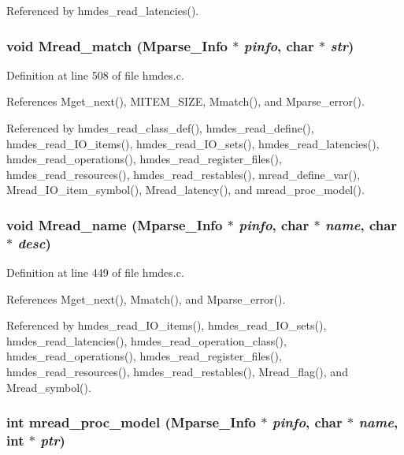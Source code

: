 Referenced by hmdes\_\-read\_\-latencies().
\subsubsection{\setlength{\rightskip}{0pt plus 5cm}void Mread\_\-match (\bf{Mparse\_\-Info} $\ast$ {\em pinfo}, char $\ast$ {\em str})}\label{hmdes_8c_6596ec52b951f99374fa8896ea78aa96}




Definition at line 508 of file hmdes.c.

References Mget\_\-next(), MITEM\_\-SIZE, Mmatch(), and Mparse\_\-error().

Referenced by hmdes\_\-read\_\-class\_\-def(), hmdes\_\-read\_\-define(), hmdes\_\-read\_\-IO\_\-items(), hmdes\_\-read\_\-IO\_\-sets(), hmdes\_\-read\_\-latencies(), hmdes\_\-read\_\-operations(), hmdes\_\-read\_\-register\_\-files(), hmdes\_\-read\_\-resources(), hmdes\_\-read\_\-restables(), mread\_\-define\_\-var(), Mread\_\-IO\_\-item\_\-symbol(), Mread\_\-latency(), and mread\_\-proc\_\-model().
\subsubsection{\setlength{\rightskip}{0pt plus 5cm}void Mread\_\-name (\bf{Mparse\_\-Info} $\ast$ {\em pinfo}, char $\ast$ {\em name}, char $\ast$ {\em desc})}\label{hmdes_8c_e2d457c134c37f83e6c72d6c0f9d2281}




Definition at line 449 of file hmdes.c.

References Mget\_\-next(), Mmatch(), and Mparse\_\-error().

Referenced by hmdes\_\-read\_\-IO\_\-items(), hmdes\_\-read\_\-IO\_\-sets(), hmdes\_\-read\_\-latencies(), hmdes\_\-read\_\-operation\_\-class(), hmdes\_\-read\_\-operations(), hmdes\_\-read\_\-register\_\-files(), hmdes\_\-read\_\-resources(), hmdes\_\-read\_\-restables(), Mread\_\-flag(), and Mread\_\-symbol().
\subsubsection{\setlength{\rightskip}{0pt plus 5cm}int mread\_\-proc\_\-model (\bf{Mparse\_\-Info} $\ast$ {\em pinfo}, char $\ast$ {\em name}, int $\ast$ {\em ptr})}\label{hmdes_8c_a0d5044667c2d6c7abc5ecc0f0cc045f}




